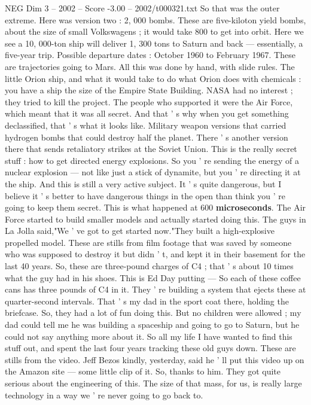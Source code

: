 \begin{textsample}{NEG Dim 3 – 2002 – Score -3.00 – 2002/t000321.txt}
So that was the outer extreme.
Here was version two : 2, 000 bombs.
These are five-kiloton yield bombs, about the size of small Volkswagens ; it would take 800 to get into orbit.
Here we see a 10, 000-ton ship will deliver 1, 300 tons to Saturn and back — essentially, a five-year trip.
Possible departure dates : October 1960 to February 1967.
These are trajectories going to Mars.
All this was done by hand, with slide rules.
The little Orion ship, and what it would take to do what Orion does with chemicals : you have a ship the size of the Empire State Building.
NASA had no interest ; they tried to kill the project.
The people who supported it were the Air Force, which meant that it was all secret.
And that ' s why when you get something declassified, that ' s what it looks like.
Military weapon versions that carried hydrogen bombs that could destroy half the planet.
There ' s another version there that sends retaliatory strikes at the Soviet Union.
This is the really secret stuff : how to get directed energy explosions.
So you ' re sending the energy of a nuclear explosion — not like just a stick of dynamite, but you ' re directing it at the ship.
And this is still a very active subject.
It ' s quite dangerous, but I believe it ' s better to have dangerous things in the open than think you ' re going to keep them secret.
This is what happened at 600 \textbf{microseconds}.
The Air Force started to build smaller models and actually started doing this.
The guys in La Jolla said,"We ' ve got to get started now."They built a high-explosive propelled model.
These are stills from film footage that was saved by someone who was supposed to destroy it but didn ' t, and kept it in their basement for the last 40 years.
So, these are three-pound charges of C4 ; that ' s about 10 times what the guy had in his shoes.
This is Ed Day putting — So each of these coffee cans has three pounds of C4 in it.
They ' re building a system that ejects these at quarter-second intervals.
That ' s my dad in the sport coat there, holding the briefcase.
So, they had a lot of fun doing this.
But no children were allowed ; my dad could tell me he was building a spaceship and going to go to Saturn, but he could not say anything more about it.
So all my life I have wanted to find this stuff out, and spent the last four years tracking these old guys down.
These are stills from the video.
Jeff Bezos kindly, yesterday, said he ' ll put this video up on the Amazon site — some little clip of it.
So, thanks to him.
They got quite serious about the engineering of this.
The size of that mass, for us, is really large technology in a way we ' re never going to go back to.

\end{textsample}

